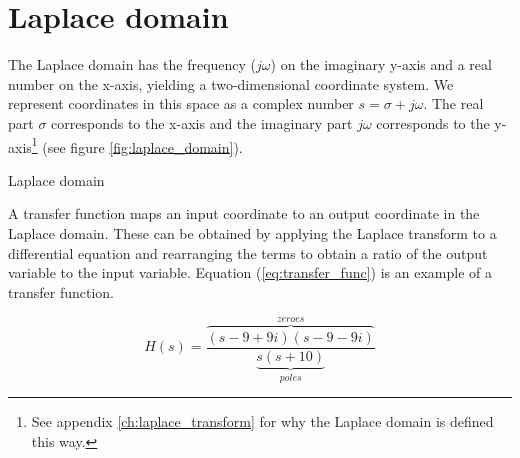 \section{Laplace domain}

The Laplace domain has the frequency ($j\omega$) on the imaginary y-axis and a
real number on the x-axis, yielding a two-dimensional coordinate system. We
represent coordinates in this space as a complex number $s = \sigma + j\omega$.
The real part $\sigma$ corresponds to the x-axis and the imaginary part
$j\omega$ corresponds to the y-axis\footnote{See appendix
\ref{ch:laplace_transform} for why the Laplace domain is defined this way.} (see
figure \ref{fig:laplace_domain}).

\begin{bookfigure}

  \caption{Laplace domain}
  \label{fig:laplace_domain}
\end{bookfigure}

A transfer function maps an input coordinate to an output coordinate in the
Laplace domain. These can be obtained by applying the Laplace transform to a
differential equation and rearranging the terms to obtain a ratio of the output
variable to the input variable. Equation (\ref{eq:transfer_func}) is an example
of a transfer function.

\begin{equation} \label{eq:transfer_func}
  H(s) = \frac{\overbrace{(s-9+9i)(s-9-9i)}^{zeroes}}
    {\underbrace{s(s+10)}_{poles}}
\end{equation}
